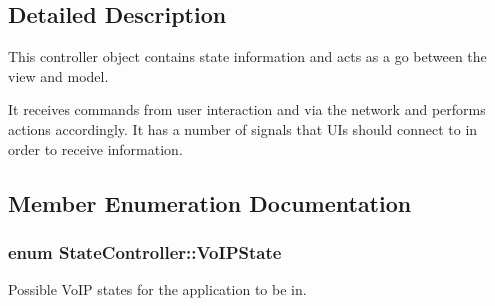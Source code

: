 \subsection{\-Detailed \-Description}
\-This controller object contains state information and acts as a go between the view and model. 

\-It receives commands from user interaction and via the network and performs actions accordingly. \-It has a number of signals that \-U\-Is should connect to in order to receive information. 

\subsection{\-Member \-Enumeration \-Documentation}
\hypertarget{class_state_controller_a1aabd2155d8e6feb201ed3941e4ee2be}{
\subsubsection[{\-Vo\-I\-P\-State}]{\setlength{\rightskip}{0pt plus 5cm}enum {\bf \-State\-Controller\-::\-Vo\-I\-P\-State}}}
\label{class_state_controller_a1aabd2155d8e6feb201ed3941e4ee2be}


\-Possible \-Vo\-I\-P states for the application to be in. 

